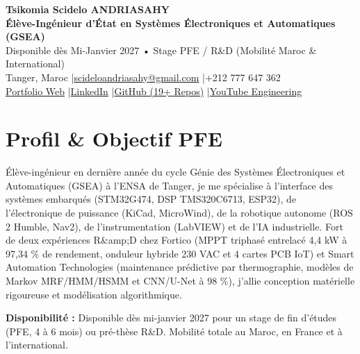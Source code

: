 \documentclass[10pt,a4paper]{article}
\begin{document}
\begin{center}
{\LARGE\bfseries Tsikomia Scidelo ANDRIASAHY}\\[0.5ex]
{\large\color{cyanacc}\bfseries Élève-Ingénieur d'État en Systèmes Électroniques et Automatiques (GSEA)}\\[0.4ex]
{\small Disponible dès Mi-Janvier 2027 • Stage PFE / R\&D (Mobilité Maroc \& International)}\\[0.5ex]
{\small Tanger, Maroc \quad|\quad \href{mailto:scideloandriasahy@gmail.com}{scideloandriasahy@gmail.com} \quad|\quad +212 777 647 362}\\[0.3ex]
{\small \href{https://scidelo-andriasahy.github.io/}{Portfolio Web} \quad|\quad \href{https://www.linkedin.com/in/scidelo}{LinkedIn} \quad|\quad \href{https://github.com/scidelo-andriasahy}{GitHub (19+ Repos)} \quad|\quad \href{https://www.youtube.com/channel/UCqIzu57g0aMRBuQBv294gXw}{YouTube Engineering}}
\end{center}
\section*{Profil \& Objectif PFE}
\noindent Élève-ingénieur en dernière année du cycle Génie des Systèmes Électroniques et Automatiques (GSEA) à l'ENSA de Tanger, je me spécialise à l'interface des systèmes embarqués (STM32G474, DSP TMS320C6713, ESP32), de l'électronique de puissance (KiCad, MicroWind), de la robotique autonome (ROS 2 Humble, Nav2), de l'instrumentation (LabVIEW) et de l'IA industrielle. Fort de deux expériences R\&amp;D chez Fortico (MPPT triphasé entrelacé 4,4 kW à 97,34 \% de rendement, onduleur hybride 230 VAC et 4 cartes PCB IoT) et Smart Automation Technologies (maintenance prédictive par thermographie, modèles de Markov MRF/HMM/HSMM et CNN/U-Net à 98 \%), j'allie conception matérielle rigoureuse et modélisation algorithmique.\par\vspace{0.5ex}
\noindent\textbf{Disponibilit\'e : }Disponible dès mi-janvier 2027 pour un stage de fin d'études (PFE, 4 à 6 mois) ou pré-thèse R\&D. Mobilité totale au Maroc, en France et à l'international.
\end{document}
